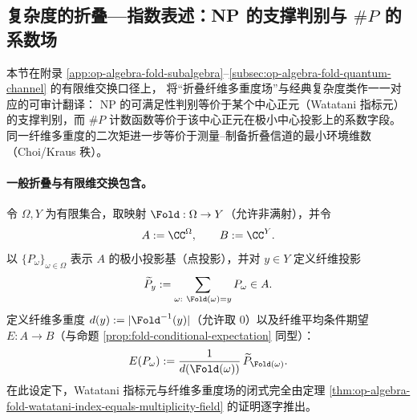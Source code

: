 %
\subsection{复杂度的折叠—指数表述：NP 的支撑判别与 \texorpdfstring{$\#P$}{\#P} 的系数场}\label{subsec:op-algebra-complexity-watatani-index-support}
本节在附录 \ref{app:op-algebra-fold-subalgebra}--\ref{subsec:op-algebra-fold-quantum-channel} 的有限维交换口径上，
将“折叠纤维多重度场”与经典复杂度类作一一对应的可审计翻译：
NP 的可满足性判别等价于某个中心正元（Watatani 指标元）的支撑判别，而 \(\#P\) 计数函数等价于该中心正元在极小中心投影上的系数字段。
同一纤维多重度的二次矩进一步等价于测量--制备折叠信道的最小环境维数（Choi/Kraus 秩）。

\paragraph{一般折叠与有限维交换包含。}
令 \(\Omega,Y\) 为有限集合，取映射 \(\Fold:\Omega\to Y\)（允许非满射），并令
\[
A:=\CC^{\Omega},\qquad B:=\CC^{Y}.
\]
以 \(\{P_\omega\}_{\omega\in\Omega}\) 表示 \(A\) 的极小投影基（点投影），并对 \(y\in Y\) 定义纤维投影
\[
\widetilde P_y:=\sum_{\omega:\ \Fold(\omega)=y}P_\omega\in A.
\]
定义纤维多重度 \(d(y):=|\Fold^{-1}(y)|\)（允许取 \(0\)）以及纤维平均条件期望 \(E:A\to B\)（与命题 \ref{prop:fold-conditional-expectation} 同型）：
\[
E(P_\omega):=\frac{1}{d(\Fold(\omega))}\,\widetilde P_{\Fold(\omega)}.
\]
在此设定下，Watatani 指标元与纤维多重度场的闭式完全由定理 \ref{thm:op-algebra-fold-watatani-index-equals-multiplicity-field} 的证明逐字推出。

